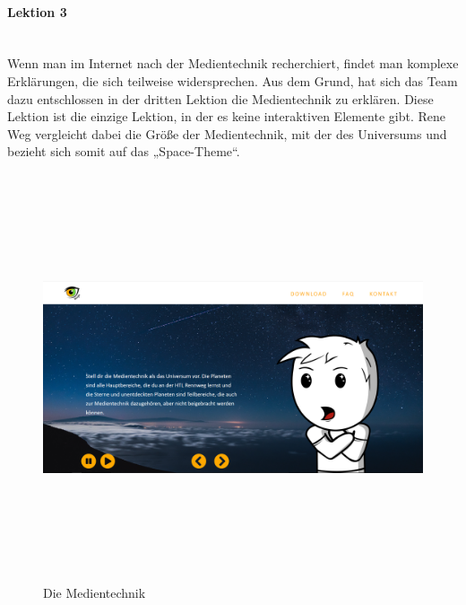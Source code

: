 \paragraph{Lektion 3} \leavevmode \\
Wenn man im Internet nach der Medientechnik recherchiert, findet man komplexe Erklärungen, die sich teilweise widersprechen. Aus dem Grund, hat sich das Team dazu entschlossen in der dritten Lektion die Medientechnik zu erklären. Diese Lektion ist die einzige Lektion, in der es keine interaktiven Elemente gibt. Rene Weg vergleicht dabei die Größe der Medientechnik, mit der des Universums und bezieht sich somit auf das „Space-Theme“. 
\begin{figure} [h]
	\centering
\includegraphics[width=12cm,height=12cm,keepaspectratio]{webseite_abb14} 
	\caption{Die Medientechnik}
\end{figure}
